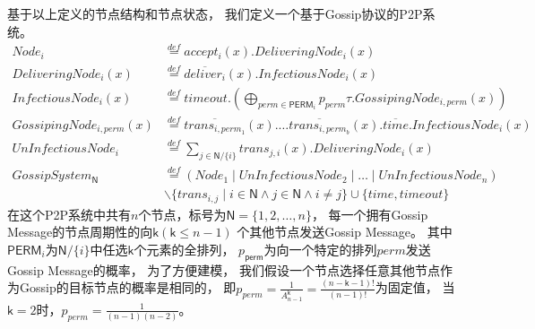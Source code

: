 基于以上定义的节点结构和节点状态，
我们定义一个基于Gossip协议的P2P系统。
\begin{align*}
   Node_i& \stackrel{def}{=} accept_i(x).DeliveringNode_i(x)\\
   DeliveringNode_i(x) &\stackrel{def}{=} \overline{deliver_i}(x).InfectiousNode_i(x)\\
   InfectiousNode_i(x)&\stackrel{def}{=}timeout.(\bigoplus_{perm\in \mathsf{PERM}_i} p_{perm}\tau.GossipingNode_{i,perm}(x))\\
   GossipingNode_{i,perm}(x)&\stackrel{def}{=}\overline{trans_{i,perm_{1}}}(x).\dots \overline{trans_{i,perm_{b}}}(x).\overline{time}.InfectiousNode_i(x)\\
   UnInfectiousNode_i &\stackrel{def}{=} \sum_{j\in \mathsf{N}/\{i\}}trans_{j,i}(x).DeliveringNode_i(x)\\
   GossipSystem_\mathsf{N}&\stackrel{def}{=}(Node_1\mid UnInfectiousNode_2\mid \dots \mid UnInfectiousNode_n)\\
   &\backslash \{trans_{i,j}\mid i\in \mathsf{N} \wedge j\in \mathsf{N} \wedge i\neq j\}\cup \{time, timeout\}
\end{align*}
在这个P2P系统中共有$n$个节点，标号为$\mathsf{N}=\{1,2,\dots, n\}$，
每一个拥有Gossip Message的节点周期性的向$\mathsf{k}(\mathsf{k}\leq n-1)$
个其他节点发送Gossip Message。
其中$\mathsf{PERM}_i$为$\mathsf{N}/\{i\}$中任选$\mathsf{k}$个元素的全排列，
$p_{\mathsf{perm}}$为向一个特定的排列$perm$发送Gossip Message的概率，
为了方便建模，
我们假设一个节点选择任意其他节点作为Gossip的目标节点的概率是相同的，
即$p_{perm} = \frac{1}{A_{n-1}^{\mathsf{k}}} = \frac{(n-\mathsf{k}-1)!}{(n-1)!}$为固定值，
当$\mathsf{k}=2$时，$p_{perm} = \frac{1}{(n-1)(n-2)}$。

